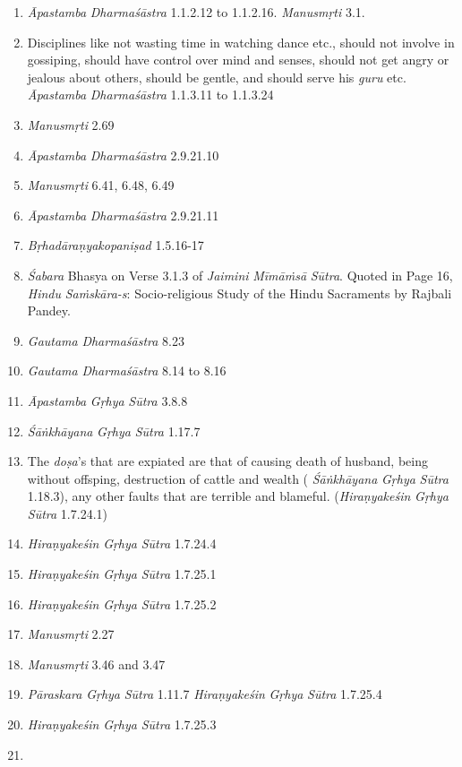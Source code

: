 \begin{enumerate}
\item
  \emph{Āpastamba} \emph{Dharmaśāstra} 1.1.2.12 to 1.1.2.16. \emph{Manusmṛti} 3.1.
\item
  Disciplines like not wasting time in watching dance etc., should not involve in gossiping, should have control over mind and senses, should not get angry or jealous about others, should be gentle, and should serve his \emph{guru} etc. \emph{Āpastamba} \emph{Dharmaśāstra} 1.1.3.11 to 1.1.3.24
\item
  \emph{Manusmṛti} 2.69
\item
  \emph{Āpastamba} \emph{Dharmaśāstra} 2.9.21.10
\item
  \emph{Manusmṛti} 6.41, 6.48, 6.49
\item
  \emph{Āpastamba} \emph{Dharmaśāstra} 2.9.21.11
\item
  \emph{Bṛhadāraṇyakopaniṣad} 1.5.16-17
\item
  \emph{Śabara} Bhasya on Verse 3.1.3 of \emph{Jaimini} \emph{Mīmāṁsā} \emph{Sūtra}. Quoted in Page 16, \emph{Hindu} \emph{Saṁskāra-s}: Socio-religious Study of the Hindu Sacraments by Rajbali Pandey.
\item
  \emph{Gautama} \emph{Dharmaśāstra} 8.23
\item
  \emph{Gautama} \emph{Dharmaśāstra} 8.14 to 8.16
\item
  \emph{Āpastamba} \emph{Gṛhya} \emph{Sūtra} 3.8.8
\item
  \emph{Śāṅkhāyana} \emph{Gṛhya} \emph{Sūtra} 1.17.7
\item
  The \emph{doṣa}'s that are expiated are that of causing death of husband, being without offsping, destruction of cattle and wealth ( \emph{Śāṅkhāyana} \emph{Gṛhya} \emph{Sūtra} 1.18.3), any other faults that are terrible and blameful. (\emph{Hiraṇyakeśin} \emph{Gṛhya} \emph{Sūtra} 1.7.24.1)
\item
  \emph{Hiraṇyakeśin} \emph{Gṛhya} \emph{Sūtra} 1.7.24.4
\item
  \emph{Hiraṇyakeśin} \emph{Gṛhya} \emph{Sūtra} 1.7.25.1
\item
  \emph{Hiraṇyakeśin} \emph{Gṛhya} \emph{Sūtra} 1.7.25.2
\item
  \emph{Manusmṛti} 2.27
\item
  \emph{Manusmṛti} 3.46 and 3.47
\item
  \emph{Pāraskara} \emph{Gṛhya} \emph{Sūtra} 1.11.7 \emph{Hiraṇyakeśin} \emph{Gṛhya} \emph{Sūtra} 1.7.25.4
\item
  \emph{Hiraṇyakeśin} \emph{Gṛhya} \emph{Sūtra} 1.7.25.3
\item

\end{enumerate}
